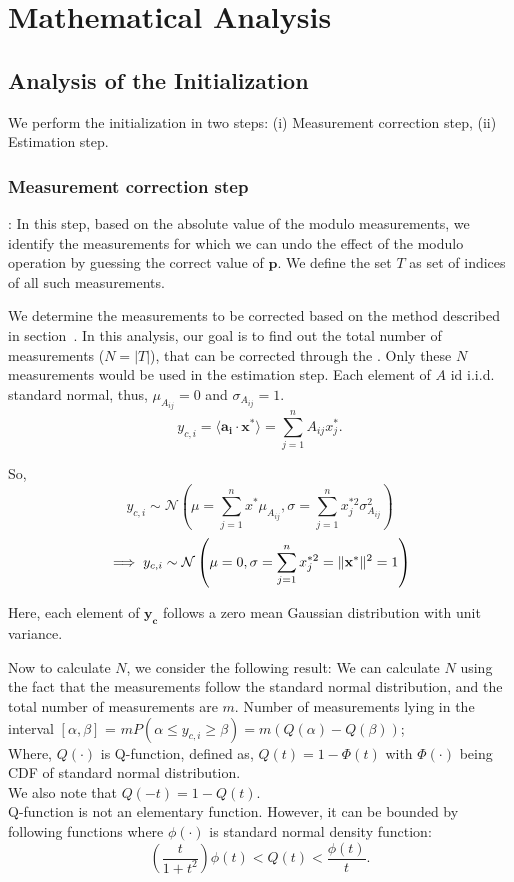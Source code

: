 \newpage

\section{Mathematical Analysis}

\subsection{Analysis of the Initialization}
We perform the initialization in two steps:
(i) Measurement correction step, (ii) Estimation step.

\subsubsection{Measurement correction step}: In this step, based on the absolute value of the modulo measurements, we identify the measurements for which we can undo the effect of the modulo operation by guessing the correct value of $\mathbf{p}$. We define the set $T$ as set of indices of all such measurements.

We determine the measurements to be corrected based on the method described in section~{}. 
In this analysis, our goal is to find out the total number of measurements ($N=|T|$), that can be corrected through the . Only these $N$ measurements would be used in the estimation step.
Each element of $A$ id i.i.d. standard normal, thus, $\mu_{A_{ij}} = 0$ and $\sigma_{A_{ij}}=1$.
$$
y_{c,i} =\langle \mathbf{a_i} \cdot \mathbf{x^*} \rangle = \sum_{j=1}^{n}A_{ij}x^*_{j}.
$$

So, 
$$
y_{c,i} \sim \mathcal{N}\left(\mu= \sum_{j=1}^{n}x^{*}\mu_{A_{ij}}, \sigma =\sum_{j=1}^{n}x^{*2}_{j}\sigma^2_{A_{ij}}\right)
$$
$$
\implies y_{c,i} \sim \mathcal{N}\left(\mu= 0, \sigma =\sum_{j=1}^{n}x^{*2}_{j} = \|\mathbf{{x}^*}\|^2 = 1 \right)
$$

Here, each element of $\mathbf{y_c}$ follows a zero mean Gaussian distribution with unit variance.

Now to calculate $N$, we consider the following result:
We can calculate $N$ using the fact that the measurements follow the standard normal distribution, and the total number of measurements are $m$.
Number of measurements lying in the interval $[\alpha,\beta]$ = $mP(\alpha \leq y_{c,i}\geq \beta) = m\left(Q(\alpha)- Q(\beta)\right)$; \\
Where, $Q(\cdot)$ is Q-function, defined as, $Q(t) = 1-\Phi(t)$ with $\Phi(\cdot)$ being CDF of standard normal distribution. \\
We also note that $Q(-t) = 1 - Q(t)$. \\
Q-function is not an elementary function. However, it can be bounded by following functions where $\phi(\cdot)$ is standard normal density function:
$$
\left(\frac{t}{1+t^2}\right)\phi(t) < Q(t) < \frac{\phi(t)}{t}.
$$

